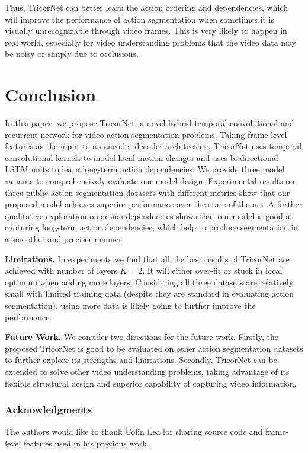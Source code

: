 \documentclass{article}
\begin{document}
Thus, TricorNet can better learn the action ordering and dependencies, which will improve the performance of action segmentation when sometimes it is visually unrecognizable through video frames. This is very likely to happen in real world, especially for video understanding problems that the video data may be noisy or simply due to occlusions. 


\section{Conclusion}
\label{sec:con}

In this paper, we propose TricorNet, a novel hybrid temporal convolutional and recurrent network for video action segmentation problems. Taking frame-level features as the input to an encoder-decoder architecture, TricorNet uses temporal convolutional kernels to model local motion changes and uses bi-directional LSTM units to learn long-term action dependencies. We provide three model variants to comprehensively evaluate our model design. Experimental results on three public action segmentation datasets with different metrics show that our proposed model achieves superior performance over the state of the art. A further qualitative exploration on action dependencies shows that our model is good at capturing long-term action dependencies, which help to produce segmentation in a smoother and preciser manner. 

\noindent \textbf{Limitations.} In experiments we find that all the best results of TricorNet are achieved with number of layers $K=2$. It will either over-fit or stuck in local optimum when adding more layers. Considering all three datasets are relatively small with limited training data (despite they are standard in evaluating action segmentation), using more data is likely going to further improve the performance.

\noindent \textbf{Future Work.} We consider two directions for the future work. Firstly, the proposed TricorNet is good to be evaluated on other action segmentation datasets to further explore its strengths and limitations. Secondly, TricorNet can be extended to solve other video understanding problems, taking advantage of its flexible structural design and superior capability of capturing video information.


\subsubsection*{Acknowledgments}
The authors would like to thank Colin Lea for sharing source code and frame-level features used in his previous work.

\small


\end{document}
